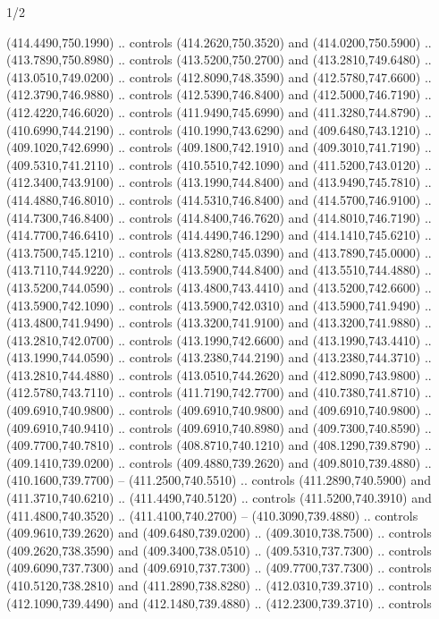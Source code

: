 \begin{flagdescription}{1/2}
\begin{scope}[xshift=0.5\flaglength]
\begin{scope}[scale=0.00745\flagwidth,xshift=-12.1mm,yshift=41.7mm]
\begin{scope}[y=0.80pt, x=0.80pt, yscale=-1, xscale=1, inner sep=0pt, outer sep=0pt]
\begin{scope}[cm={{1.33333,0.0,0.0,-1.33333,(0.0,114.66667)}}]
\begin{scope}[scale=0.100]
  (414.4490,750.1990) .. controls (414.2620,750.3520) and (414.0200,750.5900) ..
  (413.7890,750.8980) .. controls (413.5200,750.2700) and (413.2810,749.6480) ..
  (413.0510,749.0200) .. controls (412.8090,748.3590) and (412.5780,747.6600) ..
  (412.3790,746.9880) .. controls (412.5390,746.8400) and (412.5000,746.7190) ..
  (412.4220,746.6020) .. controls (411.9490,745.6990) and (411.3280,744.8790) ..
  (410.6990,744.2190) .. controls (410.1990,743.6290) and (409.6480,743.1210) ..
  (409.1020,742.6990) .. controls (409.1800,742.1910) and (409.3010,741.7190) ..
  (409.5310,741.2110) .. controls (410.5510,742.1090) and (411.5200,743.0120) ..
  (412.3400,743.9100) .. controls (413.1990,744.8400) and (413.9490,745.7810) ..
  (414.4880,746.8010) .. controls (414.5310,746.8400) and (414.5700,746.9100) ..
  (414.7300,746.8400) .. controls (414.8400,746.7620) and (414.8010,746.7190) ..
  (414.7700,746.6410) .. controls (414.4490,746.1290) and (414.1410,745.6210) ..
  (413.7500,745.1210) .. controls (413.8280,745.0390) and (413.7890,745.0000) ..
  (413.7110,744.9220) .. controls (413.5900,744.8400) and (413.5510,744.4880) ..
  (413.5200,744.0590) .. controls (413.4800,743.4410) and (413.5200,742.6600) ..
  (413.5900,742.1090) .. controls (413.5900,742.0310) and (413.5900,741.9490) ..
  (413.4800,741.9490) .. controls (413.3200,741.9100) and (413.3200,741.9880) ..
  (413.2810,742.0700) .. controls (413.1990,742.6600) and (413.1990,743.4410) ..
  (413.1990,744.0590) .. controls (413.2380,744.2190) and (413.2380,744.3710) ..
  (413.2810,744.4880) .. controls (413.0510,744.2620) and (412.8090,743.9800) ..
  (412.5780,743.7110) .. controls (411.7190,742.7700) and (410.7380,741.8710) ..
  (409.6910,740.9800) .. controls (409.6910,740.9800) and (409.6910,740.9800) ..
  (409.6910,740.9410) .. controls (409.6910,740.8980) and (409.7300,740.8590) ..
  (409.7700,740.7810) .. controls (408.8710,740.1210) and (408.1290,739.8790) ..
  (409.1410,739.0200) .. controls (409.4880,739.2620) and (409.8010,739.4880) ..
  (410.1600,739.7700) -- (411.2500,740.5510) .. controls (411.2890,740.5900) and
  (411.3710,740.6210) .. (411.4490,740.5120) .. controls (411.5200,740.3910) and
  (411.4800,740.3520) .. (411.4100,740.2700) -- (410.3090,739.4880) .. controls
  (409.9610,739.2620) and (409.6480,739.0200) .. (409.3010,738.7500) .. controls
  (409.2620,738.3590) and (409.3400,738.0510) .. (409.5310,737.7300) .. controls
  (409.6090,737.7300) and (409.6910,737.7300) .. (409.7700,737.7300) .. controls
  (410.5120,738.2810) and (411.2890,738.8280) .. (412.0310,739.3710) .. controls
  (412.1090,739.4490) and (412.1480,739.4880) .. (412.2300,739.3710) .. controls

\end{scope}
\end{scope}
\end{scope}
\end{scope}
\end{scope}
\end{flagdescription}
